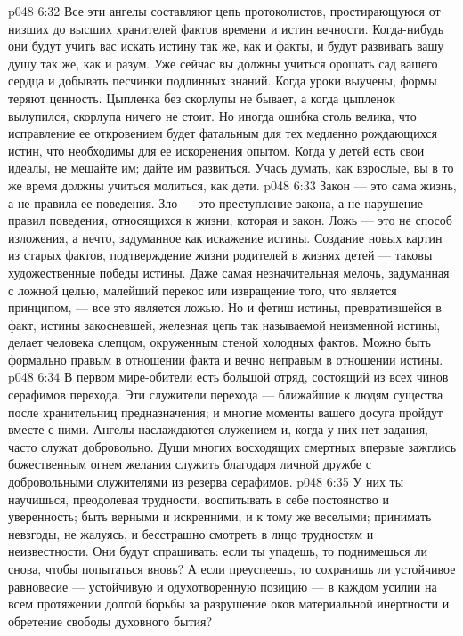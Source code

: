 \vs p048 6:32 Все эти ангелы составляют цепь протоколистов, простирающуюся от низших до высших хранителей фактов времени и истин вечности. Когда\hyp{}нибудь они будут учить вас искать истину так же, как и факты, и будут развивать вашу душу так же, как и разум. Уже сейчас вы должны учиться орошать сад вашего сердца и добывать песчинки подлинных знаний. Когда уроки выучены, формы теряют ценность. Цыпленка без скорлупы не бывает, а когда цыпленок вылупился, скорлупа ничего не стоит. Но иногда ошибка столь велика, что исправление ее откровением будет фатальным для тех медленно рождающихся истин, что необходимы для ее искоренения опытом. Когда у детей есть свои идеалы, не мешайте им; дайте им развиться. Учась думать, как взрослые, вы в то же время должны учиться молиться, как дети.
\vs p048 6:33 Закон --- это сама жизнь, а не правила ее поведения. Зло --- это преступление закона, а не нарушение правил поведения, относящихся к жизни, которая и  закон. Ложь --- это не способ изложения, а нечто, задуманное как искажение истины. Создание новых картин из старых фактов, подтверждение жизни родителей в жизнях детей --- таковы художественные победы истины. Даже самая незначительная мелочь, задуманная с ложной целью, малейший перекос или извращение того, что является принципом, --- все это является ложью. Но и фетиш истины, превратившейся в факт, истины закосневшей, железная цепь так называемой неизменной истины, делает человека слепцом, окруженным стеной холодных фактов. Можно быть формально правым в отношении факта и вечно неправым в отношении истины.
\vs p048 6:34 \pc {}\bibnobreakspace {} В первом мире\hyp{}обители есть большой отряд, состоящий из всех чинов серафимов перехода. Эти служители перехода --- ближайшие к людям существа после хранительниц предназначения; и многие моменты вашего досуга пройдут вместе с ними. Ангелы наслаждаются служением и, когда у них нет задания, часто служат добровольно. Души многих восходящих смертных впервые зажглись божественным огнем желания служить благодаря личной дружбе с добровольными служителями из резерва серафимов.
\vs p048 6:35 У них ты научишься, преодолевая трудности, воспитывать в себе постоянство и уверенность; быть верными и искренними, и к тому же веселыми; принимать невзгоды, не жалуясь, и бесстрашно смотреть в лицо трудностям и неизвестности. Они будут спрашивать: если ты упадешь, то поднимешься ли снова, чтобы попытаться вновь? А если преуспеешь, то сохранишь ли устойчивое равновесие --- устойчивую и одухотворенную позицию --- в каждом усилии на всем протяжении долгой борьбы за разрушение оков материальной инертности и обретение свободы духовного бытия?
